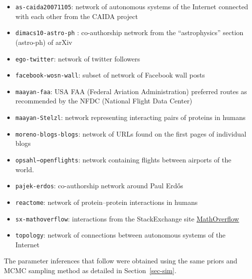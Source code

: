 \documentclass[
  sn-basic,
  10pt,
]{sn-jnl}
\providecommand{\tightlist}{%
  \setlength{\itemsep}{0pt}\setlength{\parskip}{0pt}}
\theoremstyle{thmstyleone}
\theoremstyle{thmstyleone}
\theoremstyle{remark}
\theoremstyle{plain}
\theoremstyle{plain}
\theoremstyle{remark}
\begin{document}
\begin{itemize}
\tightlist
\item
  \texttt{as-caida20071105}: network of autonomous systems of the
  Internet connected with each other from the CAIDA project
\item
  \texttt{dimacs10-astro-ph} : co-authorship network from the
  ``astrophysics'' section (astro-ph) of arXiv
\item
  \texttt{ego-twitter}: network of twitter followers
\item
  \texttt{facebook-wosn-wall}: subset of network of Facebook wall posts
\item
  \texttt{maayan-faa}: USA FAA (Federal Aviation Administration)
  preferred routes as recommended by the NFDC (National Flight Data
  Center)
\item
  \texttt{maayan-Stelzl}: network representing interacting pairs of
  proteins in humans
\item
  \texttt{moreno-blogs-blogs}: network of URLs found on the first pages
  of individual blogs
\item
  \texttt{opsahl−openflights}: network containing flights between
  airports of the world.
\item
  \texttt{pajek-erdos}: co-authorship network around Paul Erdős
\item
  \texttt{reactome}: network of protein--protein interactions in humans
\item
  \texttt{sx-mathoverflow}: interactions from the StackExchange site
  \href{https://mathoverflow.net/}{MathOverflow}
\item
  \texttt{topology}: network of connections between autonomous systems
  of the Internet
\end{itemize}

The parameter inferences that follow were obtained using the same priors
and MCMC sampling method as detailed in Section~\ref{sec-sim}.
\end{document}
